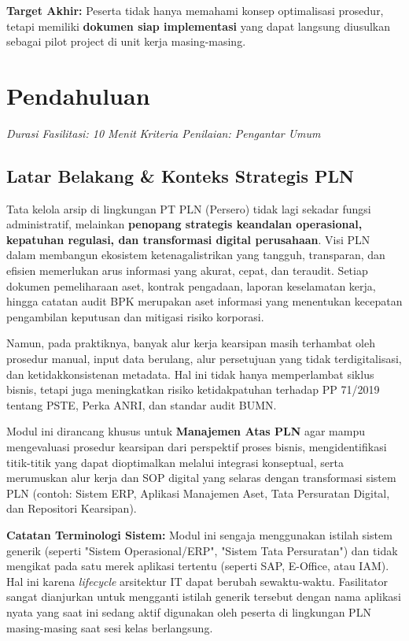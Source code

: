 \documentclass[12pt,a4paper]{report}
\begin{document}
\begin{outputbox}
\textbf{Target Akhir:} Peserta tidak hanya memahami konsep optimalisasi prosedur, tetapi memiliki \textbf{dokumen siap implementasi} yang dapat langsung diusulkan sebagai pilot project di unit kerja masing-masing.
\end{outputbox}

\newpage

\chapter{Pendahuluan}
\textit{Durasi Fasilitasi: 10 Menit} \quad \textit{Kriteria Penilaian: Pengantar Umum}

\section{Latar Belakang \& Konteks Strategis PLN}
Tata kelola arsip di lingkungan PT PLN (Persero) tidak lagi sekadar fungsi administratif, melainkan \textbf{penopang strategis keandalan operasional, kepatuhan regulasi, dan transformasi digital perusahaan}. Visi PLN dalam membangun ekosistem ketenagalistrikan yang tangguh, transparan, dan efisien memerlukan arus informasi yang akurat, cepat, dan teraudit. Setiap dokumen pemeliharaan aset, kontrak pengadaan, laporan keselamatan kerja, hingga catatan audit BPK merupakan aset informasi yang menentukan kecepatan pengambilan keputusan dan mitigasi risiko korporasi.

Namun, pada praktiknya, banyak alur kerja kearsipan masih terhambat oleh prosedur manual, input data berulang, alur persetujuan yang tidak terdigitalisasi, dan ketidakkonsistenan metadata. Hal ini tidak hanya memperlambat siklus bisnis, tetapi juga meningkatkan risiko ketidakpatuhan terhadap PP 71/2019 tentang PSTE, Perka ANRI, dan standar audit BUMN.

Modul ini dirancang khusus untuk \textbf{Manajemen Atas PLN} agar mampu mengevaluasi prosedur kearsipan dari perspektif proses bisnis, mengidentifikasi titik-titik yang dapat dioptimalkan melalui integrasi konseptual, serta merumuskan alur kerja dan SOP digital yang selaras dengan transformasi sistem PLN (contoh: Sistem ERP, Aplikasi Manajemen Aset, Tata Persuratan Digital, dan Repositori Kearsipan).

\begin{warnbox}
\textbf{Catatan Terminologi Sistem:} Modul ini sengaja menggunakan istilah sistem generik (seperti "Sistem Operasional/ERP", "Sistem Tata Persuratan") dan tidak mengikat pada satu merek aplikasi tertentu (seperti SAP, E-Office, atau IAM). Hal ini karena \textit{lifecycle} arsitektur IT dapat berubah sewaktu-waktu. Fasilitator sangat dianjurkan untuk mengganti istilah generik tersebut dengan nama aplikasi nyata yang saat ini sedang aktif digunakan oleh peserta di lingkungan PLN masing-masing saat sesi kelas berlangsung.
\end{warnbox}
\end{document}

